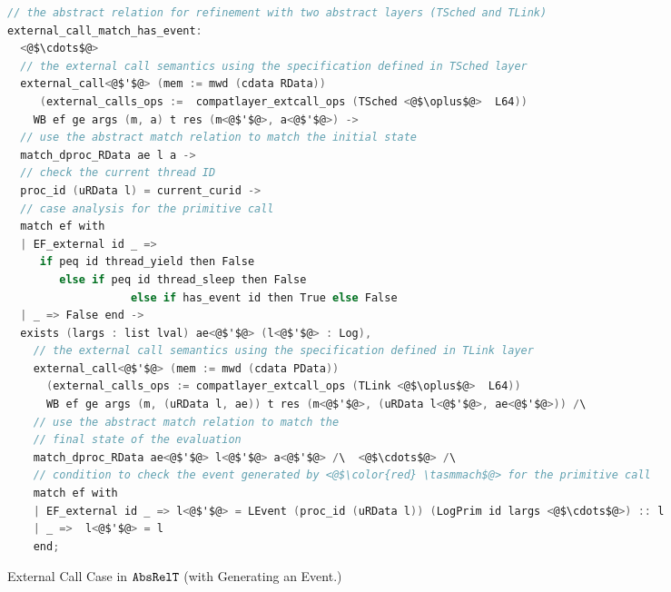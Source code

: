 \begin{figure}
\begin{lstlisting}[language=C]
// the abstract relation for refinement with two abstract layers (TSched and TLink)
external_call_match_has_event:
  <@$\cdots$@>
  // the external call semantics using the specification defined in TSched layer  
  external_call<@$'$@> (mem := mwd (cdata RData)) 
     (external_calls_ops :=  compatlayer_extcall_ops (TSched <@$\oplus$@>  L64))
    WB ef ge args (m, a) t res (m<@$'$@>, a<@$'$@>) ->
  // use the abstract match relation to match the initial state
  match_dproc_RData ae l a ->
  // check the current thread ID
  proc_id (uRData l) = current_curid ->
  // case analysis for the primitive call
  match ef with
  | EF_external id _ => 
     if peq id thread_yield then False
        else if peq id thread_sleep then False
                   else if has_event id then True else False
  | _ => False end -> 
  exists (largs : list lval) ae<@$'$@> (l<@$'$@> : Log),
    // the external call semantics using the specification defined in TLink layer
    external_call<@$'$@> (mem := mwd (cdata PData)) 
      (external_calls_ops := compatlayer_extcall_ops (TLink <@$\oplus$@>  L64))
      WB ef ge args (m, (uRData l, ae)) t res (m<@$'$@>, (uRData l<@$'$@>, ae<@$'$@>)) /\
    // use the abstract match relation to match the
    // final state of the evaluation      
    match_dproc_RData ae<@$'$@> l<@$'$@> a<@$'$@> /\  <@$\cdots$@> /\  
    // condition to check the event generated by <@$\color{red} \tasmmach$@> for the primitive call
    match ef with 
    | EF_external id _ => l<@$'$@> = LEvent (proc_id (uRData l)) (LogPrim id largs <@$\cdots$@>) :: l
    | _ =>  l<@$'$@> = l
    end;
\end{lstlisting}
\caption{External Call Case in ${\mathrm{\texttt{AbsRelT}}}$ (with Generating an Event.)}
\label{fig:chapter:conlink:two-cases-of-abs-rel-t}
\end{figure}


